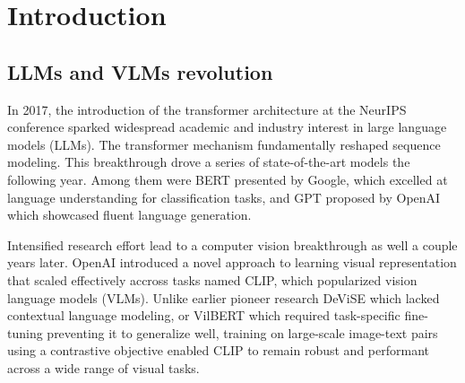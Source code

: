 \documentclass[12pt,twoside]{report}
\date{June 2025}
\begin{document}



\pagestyle{fancy}
\setcounter{page}{1}







\cleardoublepage
{}
\setcounter{page}{1}

\chapter{Introduction}
\section{LLMs and VLMs revolution}
In 2017, the introduction of the transformer architecture\cite{Transformer} at the NeurIPS conference sparked widespread academic and industry interest in large language models (LLMs). The transformer mechanism fundamentally reshaped sequence modeling. This breakthrough drove a series of state-of-the-art models the following year. Among them were BERT\cite{BERT} presented by Google, which excelled at language understanding for classification tasks, and GPT\cite{GPT} proposed by OpenAI which showcased fluent language generation.

Intensified research effort lead to a computer vision breakthrough as well a couple years later. OpenAI introduced a novel approach to learning visual representation that scaled effectively accross tasks named CLIP\cite{CLIP}, which popularized vision language models (VLMs). Unlike earlier pioneer research DeViSE\cite{DeViSE} which lacked contextual language modeling, or VilBERT\cite{ViLBERT} which required task-specific fine-tuning preventing it to generalize well, training on large-scale image-text pairs using a contrastive objective enabled CLIP to remain robust and performant across a wide range of visual tasks.
\end{document}
